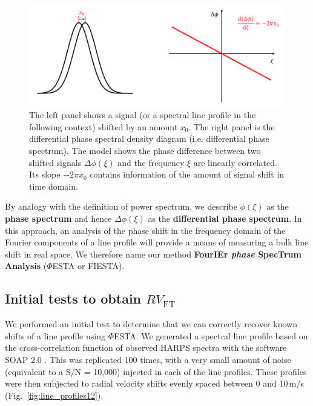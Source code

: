 \begin{figure}[tbp]
\centering
\includegraphics[width = 0.99 \linewidth]
{./Figures/Methods/FT.png}
\caption[Translation property of Fourier transform]
{The left panel shows a signal (or a spectral line profile in the following context) shifted by an amount $x_0$. 
The right panel is the differential phase spectral density diagram (i.e. differential phase spectrum). 
The model shows the phase difference between two shifted signals $\Delta \phi(\xi)$ and the frequency $\xi$ are linearly correlated. Its slope $-2 \pi x_0$ contains information of the amount of signal shift in time domain.}
\label{fig:FT}
\end{figure} 

By analogy with the definition of power spectrum, we describe $\phi(\xi)$ as the \textbf{phase spectrum} and hence $\Delta \phi(\xi)$ as the \textbf{differential phase spectrum}. In this approach, an analysis of the phase shift in the frequency domain of the Fourier components of a line profile will provide a means of measuring a bulk line shift in real space. We therefore name our method \textbf{FourIEr \textit{phase} SpecTrum Analysis} ($\mathit{\Phi}$ESTA or FIESTA). 


\subsection{Initial tests to obtain $RV_\text{FT}$}
\label{sec:Initial_tests}

We performed an initial test to determine that we can correctly recover known shifts of a line profile using $\mathit{\Phi}$ESTA. We generated a spectral line profile based on the cross-correlation function of observed HARPS spectra with the software SOAP 2.0 \cite{Dumusque2014SOAP}. This was replicated 100 times, with a very small amount of 
noise (equivalent to a S/N = 10,000) injected in each of the line profiles. These profiles were then
subjected to radial velocity shifts evenly spaced between 0 and 10\,m/s (Fig.~\ref{fig:line_profiles12}). 

